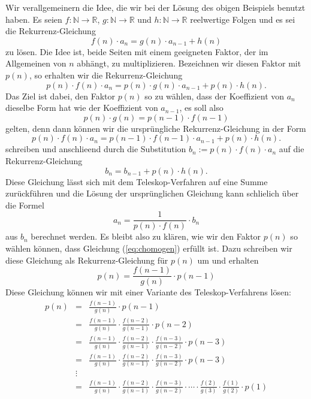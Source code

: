 Wir verallgemeinern die Idee, die wir bei der L\"{o}sung des obigen Beispiels benutzt haben.  Es seien
$f:\mathbb{N} \rightarrow \mathbb{R}$, $g:\mathbb{N} \rightarrow \mathbb{R}$ und 
$h:\mathbb{N} \rightarrow \mathbb{R}$ 
reelwertige Folgen und es sei die Rekurrenz-Gleichung
\[ 
f(n) \cdot a_n = g(n) \cdot a_{n-1} + h(n)
\]
zu l\"{o}sen.  Die Idee ist, beide Seiten mit einem geeigneten Faktor, der im Allgemeinen von $n$ abh\"{a}ngt, zu
multiplizieren.  Bezeichnen wir diesen Faktor mit $p(n)$, so erhalten wir die Rekurrenz-Gleichung
\[ 
p(n) \cdot f(n) \cdot a_n = p(n) \cdot g(n) \cdot a_{n-1} + p(n) \cdot h(n).
\]
Das Ziel ist dabei, den Faktor $p(n)$ so zu w\"{a}hlen, dass der Koeffizient von $a_n$ dieselbe Form hat wie der
Koeffizient von $a_{n-1}$, es soll also
\begin{equation}
  \label{eq:chomogen}
  p(n) \cdot g(n) = p(n-1) \cdot f(n-1)  
\end{equation}
gelten, denn dann k\"{o}nnen wir die urspr\"{u}ngliche Rekurrenz-Gleichung in der Form
\[ 
p(n) \cdot f(n) \cdot a_n = p(n-1) \cdot f(n-1) \cdot a_{n-1} + p(n) \cdot h(n).
\]
schreiben und anschlie\3end durch die Substitution $b_n := p(n) \cdot f(n) \cdot a_n$ auf die
Rekurrenz-Gleichung 
\[ 
b_n = b_{n-1} + p(n) \cdot h(n).
\]
Diese Gleichung l\"{a}sst sich mit dem Teleskop-Verfahren auf eine Summe zur\"{u}ckf\"{u}hren und die L\"{o}sung der
urspr\"{u}nglichen Gleichung kann schlie\3lich \"{u}ber die Formel
\[ 
a_n = \frac{1}{p(n) \cdot f(n)} \cdot b_n
\]
aus $b_n$ berechnet werden.  Es bleibt also zu kl\"{a}ren, wie wir den Faktor $p(n)$ so w\"{a}hlen k\"{o}nnen, dass
Gleichung (\ref{eq:chomogen}) erf\"{u}llt ist. Dazu schreiben wir diese Gleichung als Rekurrenz-Gleichung f\"{u}r
$p(n)$ um und erhalten
\[ 
  p(n) = \frac{f(n-1)}{g(n)} \cdot p(n-1) 
\]
Diese Gleichung k\"{o}nnen wir mit einer Variante des Teleskop-Verfahrens l\"{o}sen:
\[ 
\begin{array}{lcl}
p(n) & = & \frac{f(n-1)}{g(n)} \cdot p(n-1)   \\[0.2cm]
     & = & \frac{f(n-1)}{g(n)} \cdot  \frac{f(n-2)}{g(n-1)} \cdot  p(n-2) \\[0.2cm]
     & = & \frac{f(n-1)}{g(n)} \cdot  \frac{f(n-2)}{g(n-1)} \cdot \frac{f(n-3)}{g(n-2)} \cdot  p(n-3) 
           \\[0.2cm]
     & = & \frac{f(n-1)}{g(n)} \cdot  \frac{f(n-2)}{g(n-1)} \cdot \frac{f(n-3)}{g(n-2)} \cdot  p(n-3) 
           \\[0.2cm]
     & \vdots & \\
     & = & \frac{f(n-1)}{g(n)} \cdot  \frac{f(n-2)}{g(n-1)} \cdot \frac{f(n-3)}{g(n-2)} \cdot \cdots
           \cdot \frac{f(2)}{g(3)} \cdot \frac{f(1)}{g(2)} \cdot p(1) 
           \\[0.2cm]
\end{array}
\]
